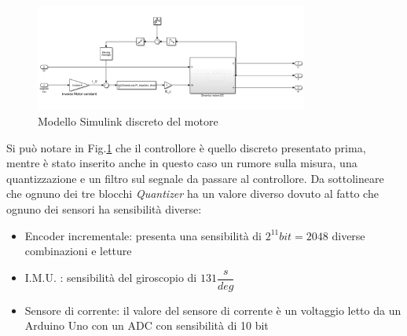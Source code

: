 \begin{figure}[H]
	\centering   	
	\includegraphics[width=0.8\textwidth]{Immagini/discrete_motor.png}
	\caption{Modello Simulink discreto del motore}
	\label{fig:discrete_motor}
\end{figure}
Si può notare in Fig.\ref{fig:discrete_motor} che il controllore è quello discreto presentato prima, mentre è stato inserito anche in questo caso un rumore sulla misura, una quantizzazione e un filtro sul segnale da passare al controllore.
Da sottolineare che ognuno dei tre blocchi \textit{Quantizer} ha un valore diverso dovuto al fatto che ognuno dei sensori ha sensibilità diverse:
\begin{itemize}
	\item Encoder incrementale: presenta una sensibilità di $2^11 bit = 2048 $ diverse combinazioni e letture
	\item I.M.U. : sensibilità del giroscopio di $131\dfrac{s}{deg}$
	\item Sensore di corrente: il valore del sensore di corrente è un voltaggio letto da un Arduino Uno con un ADC con sensibilità di 10 bit
\end{itemize}